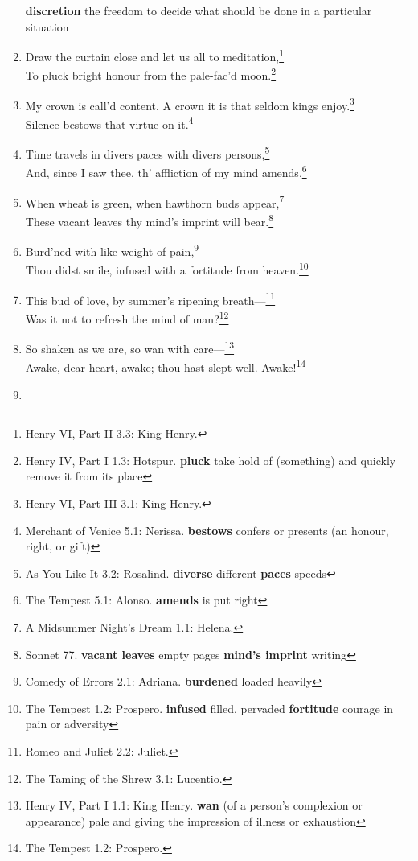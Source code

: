 \documentclass[17pt,twoside]{extarticle}
\begin{document}
\begin{enumerate}
{    \textbf{discretion} the freedom to decide what should be done in a
    particular situation}
\item
  Draw the curtain close and let us all to meditation,\footnote{Henry
    VI, Part II 3.3: King Henry.}\\To pluck bright honour from the
  pale-fac'd moon.\footnote{Henry IV, Part I 1.3: Hotspur.
    \textbf{pluck} take hold of (something) and quickly remove it from
    its place}
\item
  My crown is call'd content. A crown it is that seldom kings
  enjoy.\footnote{Henry VI, Part III 3.1: King Henry.}\\Silence bestows
  that virtue on it.\footnote{Merchant of Venice 5.1: Nerissa.
    \textbf{bestows} confers or presents (an honour, right, or gift)}
\item
  Time travels in divers paces with divers persons,\footnote{As You Like
    It 3.2: Rosalind. \textbf{diverse} different \textbf{paces} speeds}\\And,
  since I saw thee, th' affliction of my mind amends.\footnote{The
    Tempest 5.1: Alonso. \textbf{amends} is put right}
\item
  When wheat is green, when hawthorn buds appear,\footnote{A Midsummer
    Night's Dream 1.1: Helena.}\\These vacant leaves thy mind's imprint
  will bear.\footnote{Sonnet 77. \textbf{vacant leaves} empty pages
    \textbf{mind's imprint} writing}
\item
  Burd'ned with like weight of pain,\footnote{Comedy of Errors 2.1:
    Adriana. \textbf{burdened} loaded heavily}\\Thou didst smile,
  infused with a fortitude from heaven.\footnote{The Tempest 1.2:
    Prospero. \textbf{infused} filled, pervaded \textbf{fortitude}
    courage in pain or adversity}
\item
  This bud of love, by summer's ripening breath---\footnote{Romeo and
    Juliet 2.2: Juliet.}\\Was it not to refresh the mind of
  man?\footnote{The Taming of the Shrew 3.1: Lucentio.}
\item
  So shaken as we are, so wan with care---\footnote{Henry IV, Part I
    1.1: King Henry. \textbf{wan} (of a person's complexion or
    appearance) pale and giving the impression of illness or exhaustion}\\Awake,
  dear heart, awake; thou hast slept well. Awake!\footnote{The Tempest
    1.2: Prospero.}
\item

\end{enumerate}
\end{document}
